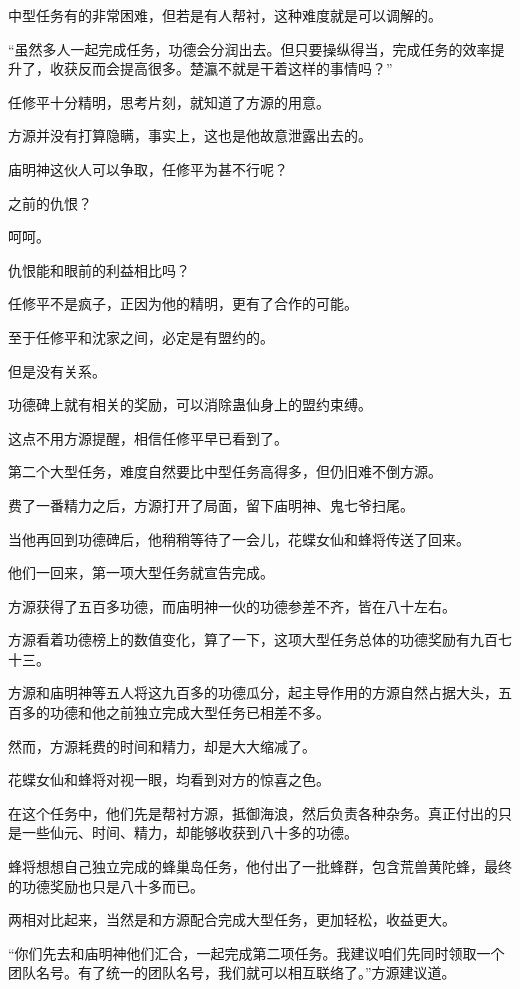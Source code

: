 \begin{this_body}
中型任务有的非常困难，但若是有人帮衬，这种难度就是可以调解的。

“虽然多人一起完成任务，功德会分润出去。但只要操纵得当，完成任务的效率提升了，收获反而会提高很多。楚瀛不就是干着这样的事情吗？”

任修平十分精明，思考片刻，就知道了方源的用意。

方源并没有打算隐瞒，事实上，这也是他故意泄露出去的。

庙明神这伙人可以争取，任修平为甚不行呢？

之前的仇恨？

呵呵。

仇恨能和眼前的利益相比吗？

任修平不是疯子，正因为他的精明，更有了合作的可能。

至于任修平和沈家之间，必定是有盟约的。

但是没有关系。

功德碑上就有相关的奖励，可以消除蛊仙身上的盟约束缚。

这点不用方源提醒，相信任修平早已看到了。

第二个大型任务，难度自然要比中型任务高得多，但仍旧难不倒方源。

费了一番精力之后，方源打开了局面，留下庙明神、鬼七爷扫尾。

当他再回到功德碑后，他稍稍等待了一会儿，花蝶女仙和蜂将传送了回来。

他们一回来，第一项大型任务就宣告完成。

方源获得了五百多功德，而庙明神一伙的功德参差不齐，皆在八十左右。

方源看着功德榜上的数值变化，算了一下，这项大型任务总体的功德奖励有九百七十三。

方源和庙明神等五人将这九百多的功德瓜分，起主导作用的方源自然占据大头，五百多的功德和他之前独立完成大型任务已相差不多。

然而，方源耗费的时间和精力，却是大大缩减了。

花蝶女仙和蜂将对视一眼，均看到对方的惊喜之色。

在这个任务中，他们先是帮衬方源，抵御海浪，然后负责各种杂务。真正付出的只是一些仙元、时间、精力，却能够收获到八十多的功德。

蜂将想想自己独立完成的蜂巢岛任务，他付出了一批蜂群，包含荒兽黄陀蜂，最终的功德奖励也只是八十多而已。

两相对比起来，当然是和方源配合完成大型任务，更加轻松，收益更大。

“你们先去和庙明神他们汇合，一起完成第二项任务。我建议咱们先同时领取一个团队名号。有了统一的团队名号，我们就可以相互联络了。”方源建议道。


\end{this_body}
